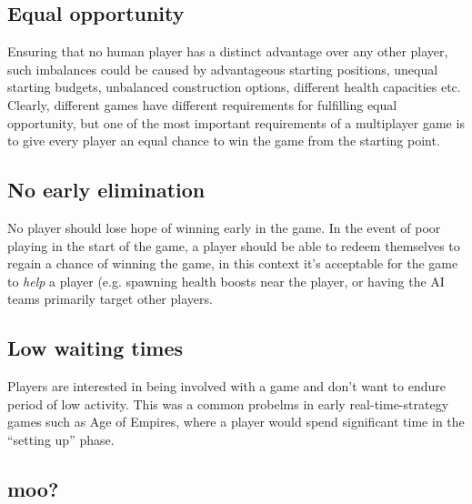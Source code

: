\subsection*{Equal opportunity}
Ensuring that no human player has a distinct advantage over any other player, such imbalances could be caused by advantageous starting positions, unequal starting budgets, unbalanced construction options, different health capacities etc. Clearly, different games have different requirements for fulfilling equal opportunity, but one of the most important requirements of a multiplayer game is to give every player an equal chance to win the game from the starting point.

\subsection*{No early elimination}
No player should lose hope of winning early in the game. In the event of poor playing in the start of the game, a player should be able to redeem themselves to regain a chance of winning the game, in this context it's acceptable for the game to \emph{help} a player (e.g. spawning health boosts near the player, or having the AI teams primarily target other players.

\subsection*{Low waiting times}
Players are interested in being involved with a game and don't want to endure period of low activity. This was a common probelms in early real-time-strategy games such as Age of Empires, where a player would spend significant time in the ``setting up'' phase.


\subsection*{moo?}

